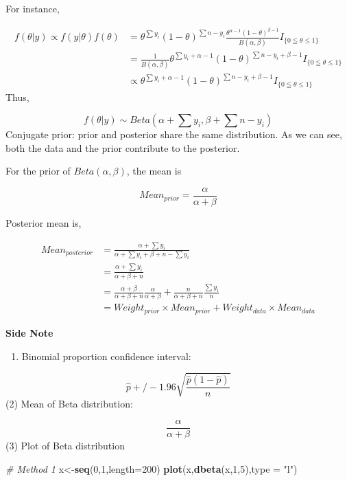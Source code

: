 \documentclass[]{book}
\newenvironment{Shaded}{\begin{snugshade}}{\end{snugshade}}
\newcommand{\KeywordTok}[1]{\textcolor[rgb]{0.13,0.29,0.53}{\textbf{#1}}}
\newcommand{\DataTypeTok}[1]{\textcolor[rgb]{0.13,0.29,0.53}{#1}}
\newcommand{\DecValTok}[1]{\textcolor[rgb]{0.00,0.00,0.81}{#1}}
\newcommand{\StringTok}[1]{\textcolor[rgb]{0.31,0.60,0.02}{#1}}
\newcommand{\CommentTok}[1]{\textcolor[rgb]{0.56,0.35,0.01}{\textit{#1}}}
\newcommand{\NormalTok}[1]{#1}
\providecommand{\tightlist}{%
  \setlength{\itemsep}{0pt}\setlength{\parskip}{0pt}}
\begin{document}
For instance,

\[\begin{aligned} f(\theta |y) \propto f(y|\theta)f(\theta)&=\theta^{\sum y_i}(1-\theta)^{\sum n-y_i}\frac{\theta^{\alpha-1}(1-\theta)^{\beta-1}}{B(\alpha,\beta)} I_{\{0 \leqq \theta \leqslant 1\}} \\ &=\frac{1}{B(\alpha, \beta)}\theta^{\sum y_i+\alpha-1}(1-\theta)^{\sum n-y_i+\beta-1} I_{\{0 \leqq \theta \leqslant 1\}} \\ &\propto  \theta^{\sum y_i+\alpha-1}(1-\theta)^{\sum n-y_i+\beta-1} I_{\{0 \leqq \theta \leqslant 1\}} \end{aligned}\]
Thus,

\[f(\theta |y) \sim Beta(\alpha+\sum y_i,\beta+\sum n-y_i)\] Conjugate
prior: prior and posterior share the same distribution. As we can see,
both the data and the prior contribute to the posterior.

For the prior of \(Beta(\alpha, \beta)\), the mean is

\[Mean_{prior}=\frac{\alpha}{\alpha+\beta}\]

Posterior mean is,

\[\begin{aligned} Mean_{posterior}&= \frac{\alpha+\sum y_i}{\alpha+\sum y_i+\beta+n-\sum y_i} \\ &=\frac{\alpha+\sum y_i}{\alpha+\beta+n} \\ &= \frac{\alpha+\beta}{\alpha+\beta+n}\frac{\alpha}{\alpha+\beta}+\frac{n}{\alpha+\beta+n}\frac{\sum y_i}{n} \\ &= Weight_{prior} \times Mean_{prior}+Weight_{data} \times Mean_{data}\end{aligned}\]

\textbf{Side Note}

\begin{enumerate}
\def\labelenumi{(\arabic{enumi})}
\tightlist
\item
  Binomial proportion confidence interval:
\end{enumerate}

\[\hat{p} +/- 1.96 \sqrt{\frac{\hat{p}(1-\hat{p})}{n}}\] (2) Mean of
Beta distribution:

\[\frac{\alpha}{\alpha+\beta}\] (3) Plot of Beta distribution

\begin{Shaded}
\begin{Highlighting}[]
\CommentTok{# Method 1}
\NormalTok{x<-}\KeywordTok{seq}\NormalTok{(}\DecValTok{0}\NormalTok{,}\DecValTok{1}\NormalTok{,}\DataTypeTok{length=}\DecValTok{200}\NormalTok{)}
\KeywordTok{plot}\NormalTok{(x,}\KeywordTok{dbeta}\NormalTok{(x,}\DecValTok{1}\NormalTok{,}\DecValTok{5}\NormalTok{),}\DataTypeTok{type =} \StringTok{"l"}\NormalTok{)}
\end{Highlighting}
\end{Shaded}
\end{document}

